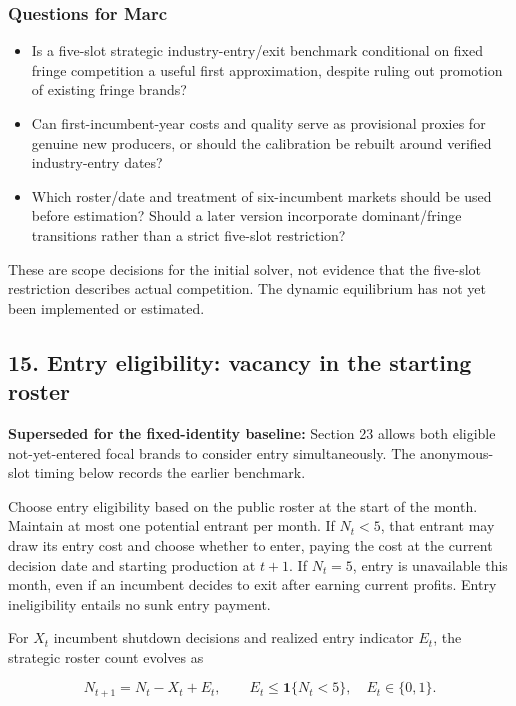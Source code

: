 \documentclass[10pt,]{article}
\providecommand{\tightlist}{%
  \setlength{\itemsep}{0pt}\setlength{\parskip}{0pt}}
\begin{document}
\subsubsection{Questions for Marc}\label{questions-for-marc}

\begin{itemize}
\tightlist
\item
  Is a five-slot strategic industry-entry/exit benchmark conditional on
  fixed fringe competition a useful first approximation, despite ruling
  out promotion of existing fringe brands?
\item
  Can first-incumbent-year costs and quality serve as provisional
  proxies for genuine new producers, or should the calibration be
  rebuilt around verified industry-entry dates?
\item
  Which roster/date and treatment of six-incumbent markets should be
  used before estimation? Should a later version incorporate
  dominant/fringe transitions rather than a strict five-slot
  restriction?
\end{itemize}

These are scope decisions for the initial solver, not evidence that the
five-slot restriction describes actual competition. The dynamic
equilibrium has not yet been implemented or estimated.

\subsection{15. Entry eligibility: vacancy in the starting
roster}\label{entry-eligibility-vacancy-in-the-starting-roster}

\textbf{Superseded for the fixed-identity baseline:} Section 23 allows
both eligible not-yet-entered focal brands to consider entry
simultaneously. The anonymous-slot timing below records the earlier
benchmark.

Choose entry eligibility based on the public roster at the start of the
month. Maintain at most one potential entrant per month. If \(N_t<5\),
that entrant may draw its entry cost and choose whether to enter, paying
the cost at the current decision date and starting production at
\(t+1\). If \(N_t=5\), entry is unavailable this month, even if an
incumbent decides to exit after earning current profits. Entry
ineligibility entails no sunk entry payment.

For \(X_t\) incumbent shutdown decisions and realized entry indicator
\(E_t\), the strategic roster count evolves as

\[
N_{t+1}=N_t-X_t+E_t,\qquad
E_t\leq\mathbf{1}\{N_t<5\},\quad E_t\in\{0,1\}.
\]
\end{document}
